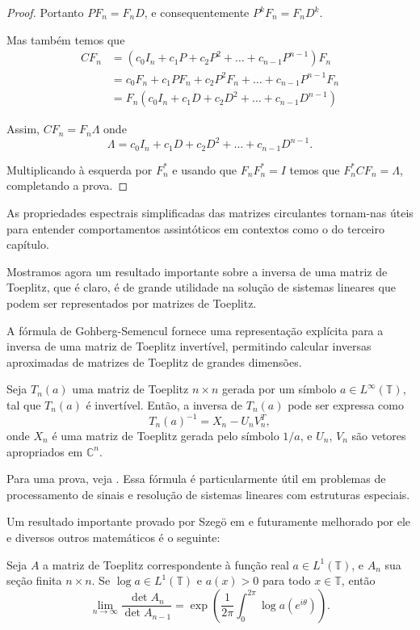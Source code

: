 \begin{proof}
  Portanto $P F_n = F_n D$, e consequentemente $P^kF_n = F_nD^k$.

  Mas também temos que \begin{align*}
    C F_n & = \left( c_0 I_n + c_1 P + c_2 P^2 + \dots + c_{n-1} P^{n-1} \right) F_n \\
          & = c_0 F_n + c_1 P F_n + c_2 P^2 F_n + \dots + c_{n-1} P^{n-1} F_n        \\
          & = F_n \left( c_0 I_n + c_1 D + c_2 D^2 + \dots + c_{n-1} D^{n-1} \right)
  \end{align*}

  Assim, $C F_n = F_n \Lambda$ onde \[\Lambda = c_0 I_n + c_1 D + c_2 D^2 + \dots + c_{n-1} D^{n-1}.\]

  Multiplicando à esquerda por $F_n^*$ e usando que $F_n F_n^* = I$ temos que $F_n^* C F_n = \Lambda$, completando a prova.
\end{proof}

As propriedades espectrais simplificadas das matrizes circulantes tornam-nas úteis para entender comportamentos assintóticos em contextos como o do terceiro capítulo.

Mostramos agora um resultado importante sobre a inversa de uma matriz de Toeplitz, que é claro, é de grande utilidade na solução de sistemas lineares que podem ser representados por matrizes de Toeplitz.

A fórmula de Gohberg-Semencul fornece uma representação explícita para a inversa de uma matriz de Toeplitz invertível, permitindo calcular inversas aproximadas de matrizes de Toeplitz de grandes dimensões.
\begin{theorem*}
  Seja $ T_n(a)$ uma matriz de Toeplitz $ n \times n$ gerada por um símbolo $ a \in L^\infty(\mathbb{T})$, tal que $ T_n(a)$ é invertível. Então, a inversa de $ T_n(a)$ pode ser expressa como
  \[
    T_n(a)^{-1} = X_n - U_n V_n^T,
  \]
  onde $ X_n$ é uma matriz de Toeplitz gerada pelo símbolo $1 / a$, e $ U_n$, $ V_n$ são vetores apropriados em $ \mathbb{C}^n$.
\end{theorem*}
Para uma prova, veja \cite{gohberg1972}.
Essa fórmula é particularmente útil em problemas de processamento de sinais e resolução de sistemas lineares com estruturas especiais.

Um resultado importante provado por Szegö em \cite{szego1915} e futuramente melhorado por ele e diversos outros matemáticos é o seguinte:
\begin{theorem*}
  Seja $A$ a matriz de Toeplitz correspondente à função real $a \in L^1(\mathbb{T})$, e $A_n$ sua seção finita $n \times n$. Se $\log a \in L^1(\mathbb{T})$ e $a(x) > 0$ para todo $x \in \mathbb{T}$, então \[\lim_{n\to \infty} \frac{\det A_n}{\det A_{n-1}} = \exp\left(\frac{1}{2\pi} \int_{0}^{2\pi} \log a\left(e^{i\theta}\right) \right)\text{.}\]
\end{theorem*}

